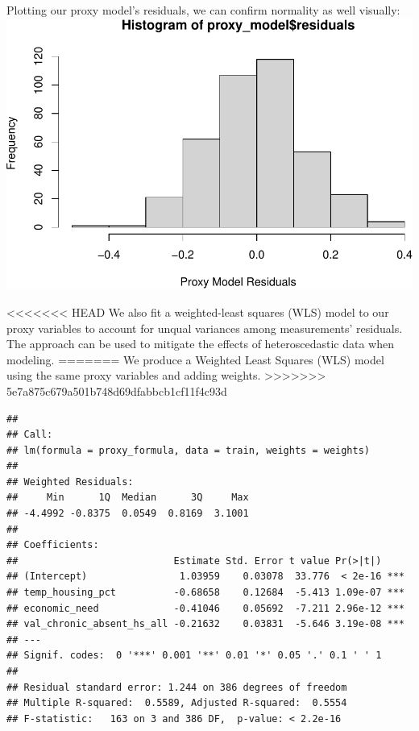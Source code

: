 \documentclass[
  man,floatsintext]{apa6}
\begin{document}
Plotting our proxy model's residuals, we can confirm normality as well visually:
\includegraphics{final-project_files/figure-latex/proxy-residual-plot-1.pdf}

<<<<<<< HEAD
We also fit a weighted-least squares (WLS) model to our proxy variables to account for unqual variances among measurements' residuals. The approach can be used to mitigate the effects of heteroscedastic data when modeling.
=======
We produce a Weighted Least Squares (WLS) model using the same proxy variables and adding weights.
>>>>>>> 5e7a875c679a501b748d69dfabbcb1cf11f4c93d

\begin{verbatim}
## 
## Call:
## lm(formula = proxy_formula, data = train, weights = weights)
## 
## Weighted Residuals:
##     Min      1Q  Median      3Q     Max 
## -4.4992 -0.8375  0.0549  0.8169  3.1001 
## 
## Coefficients:
##                           Estimate Std. Error t value Pr(>|t|)    
## (Intercept)                1.03959    0.03078  33.776  < 2e-16 ***
## temp_housing_pct          -0.68658    0.12684  -5.413 1.09e-07 ***
## economic_need             -0.41046    0.05692  -7.211 2.96e-12 ***
## val_chronic_absent_hs_all -0.21632    0.03831  -5.646 3.19e-08 ***
## ---
## Signif. codes:  0 '***' 0.001 '**' 0.01 '*' 0.05 '.' 0.1 ' ' 1
## 
## Residual standard error: 1.244 on 386 degrees of freedom
## Multiple R-squared:  0.5589, Adjusted R-squared:  0.5554 
## F-statistic:   163 on 3 and 386 DF,  p-value: < 2.2e-16
\end{verbatim}
\end{document}
